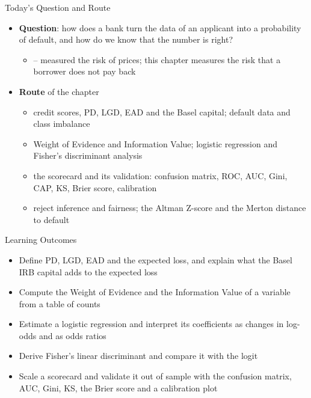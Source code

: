 \begin{frame}{Today's Question and Route}
\itemsize{\small}
\begin{itemize}
    \item \textbf{Question}: how does a bank turn the data of an applicant into a probability of default, and how do we know that the number is right?
    \begin{itemize}
        \item {}-- measured the risk of prices; this chapter measures the risk that a borrower does not pay back
    \end{itemize}
    \item \textbf{Route} of the chapter
    \begin{itemize}
        \item credit scores, PD, LGD, EAD and the Basel capital; default data and class imbalance
        \item Weight of Evidence and Information Value; logistic regression and Fisher's discriminant analysis
        \item the scorecard and its validation: confusion matrix, ROC, AUC, Gini, CAP, KS, Brier score, calibration
        \item reject inference and fairness; the Altman Z-score and the Merton distance to default
    \end{itemize}
\end{itemize}
\end{frame}

\begin{frame}{Learning Outcomes}
\itemsize{\small}
\begin{itemize}
    \item Define PD, LGD, EAD and the expected loss, and explain what the Basel IRB capital adds to the expected loss
    \item Compute the Weight of Evidence and the Information Value of a variable from a table of counts
    \item Estimate a logistic regression and interpret its coefficients as changes in log-odds and as odds ratios
    \item Derive Fisher's linear discriminant and compare it with the logit
    \item Scale a scorecard and validate it out of sample with the confusion matrix, AUC, Gini, KS, the Brier score and a calibration plot
\end{itemize}
\end{frame}

